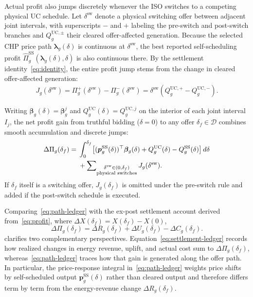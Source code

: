 \documentclass[journal]{IEEEtran}
\newcommand{\bp}{\bm p}
\newcommand{\blambda}{\bm\lambda}
\newcommand{\UC}{\mathrm{UC}}
\newcommand{\SSched}{\mathrm{SS}}
\begin{document}
Actual profit also jumps discretely whenever the ISO switches to a competing physical UC schedule. Let $\delta^{\mathrm{sw}}$ denote a physical switching offer between adjacent joint intervals, with superscripts $-$ and $+$ labeling the pre-switch and post-switch branches and $Q_g^{\UC,\pm}$ their cleared offer-affected generation. Because the selected CHP price path $\blambda_g(\delta)$ is continuous at $\delta^{\mathrm{sw}}$, the best reported self-scheduling profit $\widehat{\Pi}_g^{\SSched}(\blambda_g(\delta),\delta)$ is also continuous there. By the settlement identity~\eqref{eq:identity}, the entire profit jump stems from the change in cleared offer-affected generation:
\begin{equation}
\begin{aligned}
J_g(\delta^{\mathrm{sw}})
\!\!=\!\! \Pi_g^+(\delta^{\mathrm{sw}}) \!\!-\!\! \Pi_g^-(\delta^{\mathrm{sw}})\!\!=\!\! \delta^{\mathrm{sw}}\!\left(Q_g^{\UC,+} \!\!-\!\! Q_g^{\UC,-}\right).
\end{aligned}
\label{eq:physical-jump}
\end{equation}

Writing $\bm{\beta}_g(\delta)=\bm{\beta}_g^j$ and $Q_g^{\UC}(\delta)=Q_g^{\UC,j}$ on the interior of each joint interval $I_j$, the net profit gain from truthful bidding ($\delta=0$) to any offer $\delta_f\in\mathcal{D}$ combines smooth accumulation and discrete jumps:
\begin{align}
\Delta\Pi_g(\delta_f)
={}&\int_0^{\delta_f}\!
\left[
(\bp_g^{\SSched}(\delta))^\top\bm{\beta}_g(\delta)
+ Q_g^{\UC}(\delta) - Q_g^{\SSched}(\delta)
\right]d\delta\notag\\
&+ \sum\nolimits_{\substack{\delta^{\mathrm{sw}}\in(0,\delta_f)\\\text{physical switches}}}
J_g(\delta^{\mathrm{sw}}).
\label{eq:path-ledger}
\end{align}
If $\delta_f$ itself is a switching offer, $J_g(\delta_f)$ is omitted under the pre-switch rule and added if the post-switch schedule is executed.

Comparing~\eqref{eq:path-ledger} with the ex-post settlement account derived from~\eqref{eq:profit}, where $\Delta X(\delta_f)=X(\delta_f)-X(0)$,
\begin{equation}
\Delta\Pi_g(\delta_f) = \Delta R_g(\delta_f) + \Delta U_g(\delta_f) - \Delta C_g(\delta_f).\label{eq:settlement-ledger}
\end{equation}
clarifies two complementary perspectives. Equation~\eqref{eq:settlement-ledger} records how realized changes in energy revenue, uplift, and actual cost sum to $\Delta\Pi_g(\delta_f)$, whereas~\eqref{eq:path-ledger} traces how that gain is generated along the offer path. In particular, the price-response integral in~\eqref{eq:path-ledger} weights price shifts by self-scheduled output $\bp_g^{\SSched}(\delta)$ rather than cleared output and therefore differs term by term from the energy-revenue change $\Delta R_g(\delta_f)$.
\end{document}
